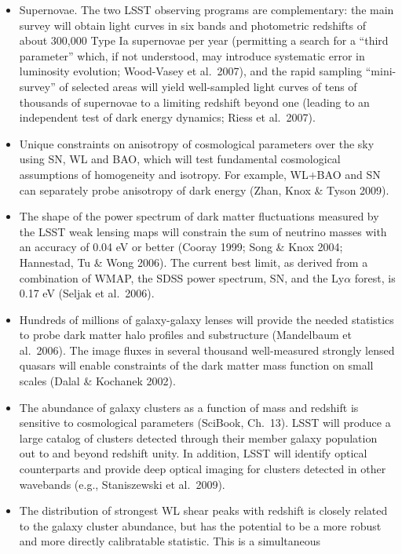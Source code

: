 \documentclass{emulateapj}
\begin{document}
\begin{itemize}
\item Supernovae. The two LSST observing programs are complementary: the main survey will 
obtain light curves in six bands and photometric redshifts of about 300,000 Type
Ia supernovae per year (permitting a search for a ``third parameter'' which,
if not understood, may introduce systematic error in luminosity evolution; 
Wood-Vasey et al.~2007), and the rapid sampling ``mini-survey'' of selected
areas will yield well-sampled light curves of tens of thousands of supernovae
to a limiting redshift beyond one (leading to an independent test of dark energy 
dynamics; Riess et al.~2007). 
\item Unique constraints on anisotropy of cosmological parameters over the sky using
SN, WL and BAO, which will test fundamental cosmological assumptions of homogeneity and isotropy.
For example, WL$+$BAO and SN can separately probe anisotropy of dark energy (Zhan, Knox \& Tyson 2009).
\item The shape of the power spectrum of dark matter fluctuations measured by
the LSST weak lensing maps will constrain the sum of neutrino masses with an accuracy 
of 0.04 eV or better (Cooray 1999; Song \& Knox 2004; Hannestad, Tu \& Wong 2006). 
The current best limit, as derived from a combination of WMAP, the SDSS power spectrum, 
SN, and the Ly$\alpha$ forest, is 0.17 eV (Seljak et al.~2006).
\item Hundreds of millions of galaxy-galaxy lenses will provide the needed statistics to probe dark matter 
halo profiles and substructure (Mandelbaum et al.~2006). The image fluxes in several thousand well-measured
strongly lensed quasars will enable constraints of the dark matter mass function on small scales (Dalal \& Kochanek 2002).
\item The abundance of galaxy clusters as a function of mass and redshift is sensitive to cosmological parameters
(SciBook, Ch.~13). LSST will produce a large catalog of clusters detected through their member galaxy population 
out to and beyond redshift unity.  In addition, LSST will identify optical counterparts and provide deep optical
imaging for clusters detected in other wavebands (e.g., Staniszewski et al.~2009). 
\item The distribution of strongest WL shear peaks with redshift is
  closely related to the galaxy cluster abundance, but has the
  potential to be a more robust and more directly calibratable statistic. This is a simultaneous 

\end{itemize}
\end{document}
